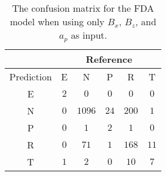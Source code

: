 \begin{table}[!ht]
	\centering
	\begin{tabular}{|c|c|c|c|c|c|}
		\hline
		 & \multicolumn{5}{|c|}{Reference} \\ \hline
		 Prediction & E & N & P & R & T \\ \hline
		 E & $2$ & $0$ & $0$ & $0$ & $0$ \\ \hline
		 N & $0$ & $1096$ & $24$ & $200$ & $1$ \\ \hline
		 P & $0$ & $1$ & $2$ & $1$ & $0$ \\ \hline
		 R & $0$ & $71$ & $1$ & $168$ & $11$ \\ \hline
		 T & $1$ & $2$ & $0$ & $10$ & $7$ \\ \hline
	\end{tabular}
	\caption{The confusion matrix for the FDA model when using only $B_{x}$, $B_{z}$, and $a_{p}$ as input.}
	\label{tab:cm:xzap:fda}
\end{table}
